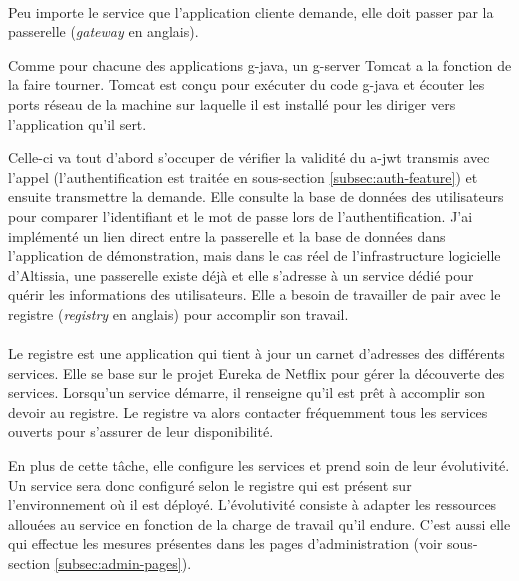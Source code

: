 \paragraph{}
Peu importe le service que l'application cliente demande, elle doit passer par la passerelle (\textit{gateway} en anglais).

Comme pour chacune des applications \gls{g-java}, un \gls{g-server} Tomcat a la fonction de la faire tourner.
Tomcat est conçu pour exécuter du code \gls{g-java} et écouter les ports réseau de la machine sur laquelle il est installé pour les diriger vers l'application qu'il sert\cite{noauthor_apache_nodate}.

Celle-ci va tout d'abord s'occuper de vérifier la validité du \gls{a-jwt} transmis avec l'appel (l'authentification est traitée en sous-section \ref{subsec:auth-feature}) et ensuite transmettre la demande.
Elle consulte la base de données des utilisateurs pour comparer l'identifiant et le mot de passe lors de l'authentification.
J'ai implémenté un lien direct entre la passerelle et la base de données dans l'application de démonstration, mais dans le cas réel de l'infrastructure logicielle d'Altissia, une passerelle existe déjà et elle s'adresse à un service dédié pour quérir les informations des utilisateurs.
Elle a besoin de travailler de pair avec le registre (\textit{registry} en anglais) pour accomplir son travail.

\paragraph{}
Le registre est une application qui tient à jour un carnet d'adresses des différents services.
Elle se base sur le projet Eureka de Netflix\cite{noauthor_aws_2019} pour gérer la découverte des services.
Lorsqu'un service démarre, il renseigne qu'il est prêt à accomplir son devoir au registre.
Le registre va alors contacter fréquemment tous les services ouverts pour s'assurer de leur disponibilité.

En plus de cette tâche, elle configure les services et prend soin de leur évolutivité.
Un service sera donc configuré selon le registre qui est présent sur l'environnement où il est déployé.
L'évolutivité consiste à adapter les ressources allouées au service en fonction de la charge de travail qu'il endure.
C'est aussi elle qui effectue les mesures présentes dans les pages d'administration (voir sous-section \ref{subsec:admin-pages}).

